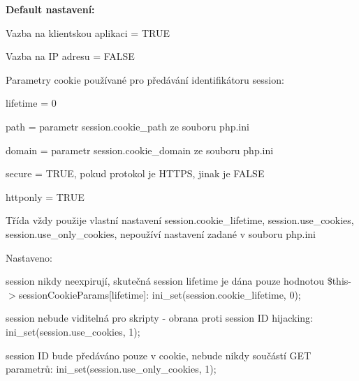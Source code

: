 {\bfseries Default nastavení\+:}

Vazba na klientskou aplikaci = T\+R\+UE

Vazba na IP adresu = F\+A\+L\+SE

Parametry cookie používané pro předávání identifikátoru session\+:
\begin{DoxyItemize}
\item lifetime = 0
\item path = parametr session.\+cookie\+\_\+path ze souboru php.\+ini
\item domain = parametr session.\+cookie\+\_\+domain ze souboru php.\+ini
\item secure = T\+R\+UE, pokud protokol je H\+T\+T\+PS, jinak je F\+A\+L\+SE
\item httponly = T\+R\+UE
\end{DoxyItemize}

Třída vždy použije vlastní nastavení session.\+cookie\+\_\+lifetime, session.\+use\+\_\+cookies, session.\+use\+\_\+only\+\_\+cookies, nepoužíví nastavení zadané v souboru php.\+ini

Nastaveno\+:
\begin{DoxyItemize}
\item session nikdy neexpirují, skutečná session lifetime je dána pouze hodnotou \$this-\/$>$session\+Cookie\+Params\mbox{[}\textquotesingle{}lifetime\textquotesingle{}\mbox{]}\+: ini\+\_\+set(\textquotesingle{}session.\+cookie\+\_\+lifetime\textquotesingle{}, 0);
\item session nebude viditelná pro skripty -\/ obrana proti session ID hijacking\+: ini\+\_\+set(\textquotesingle{}session.\+use\+\_\+cookies\textquotesingle{}, 1);
\item session ID bude předáváno pouze v cookie, nebude nikdy součástí G\+ET parametrů\+: ini\+\_\+set(\textquotesingle{}session.\+use\+\_\+only\+\_\+cookies\textquotesingle{}, 1);
\end{DoxyItemize}


